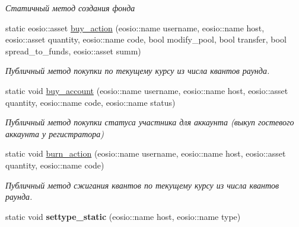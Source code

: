 \begin{DoxyCompactItemize}
\begin{DoxyCompactList}\small\item\em Статичный метод создания фонда \end{DoxyCompactList}\item 
\mbox{\label{classunicore_a278664e711bbb5194481633ae96bbc75}} 
static eosio\+::asset \mbox{\hyperlink{classunicore_a278664e711bbb5194481633ae96bbc75}{buy\+\_\+action}} (eosio\+::name username, eosio\+::name host, eosio\+::asset quantity, eosio\+::name code, bool modify\+\_\+pool, bool transfer, bool spread\+\_\+to\+\_\+funds, eosio\+::asset summ)
\begin{DoxyCompactList}\small\item\em Публичный метод покупки по текущему курсу из числа квантов раунда. \end{DoxyCompactList}\item 
\mbox{\label{classunicore_a98f88515bc39a8534fbe42aba341ae3b}} 
static void \mbox{\hyperlink{classunicore_a98f88515bc39a8534fbe42aba341ae3b}{buy\+\_\+account}} (eosio\+::name username, eosio\+::name host, eosio\+::asset quantity, eosio\+::name code, eosio\+::name status)
\begin{DoxyCompactList}\small\item\em Публичный метод покупки статуса участника для аккаунта (выкуп гостевого аккаунта у регистратора) \end{DoxyCompactList}\item 
\mbox{\label{classunicore_a686b70b2ba7f98510b783d4093defdb6}} 
static void \mbox{\hyperlink{classunicore_a686b70b2ba7f98510b783d4093defdb6}{burn\+\_\+action}} (eosio\+::name username, eosio\+::name host, eosio\+::asset quantity, eosio\+::name code)
\begin{DoxyCompactList}\small\item\em Публичный метод сжигания квантов по текущему курсу из числа квантов раунда. \end{DoxyCompactList}\item 
\mbox{\label{classunicore_ada4e4997f2a64086d89dd64c26b13cb4}} 
static void {\bfseries settype\+\_\+static} (eosio\+::name host, eosio\+::name type)
\item 
\mbox{\label{classunicore_a26f7df861487d0d3b018376b9b3fea9d}} 

\end{DoxyCompactItemize}

